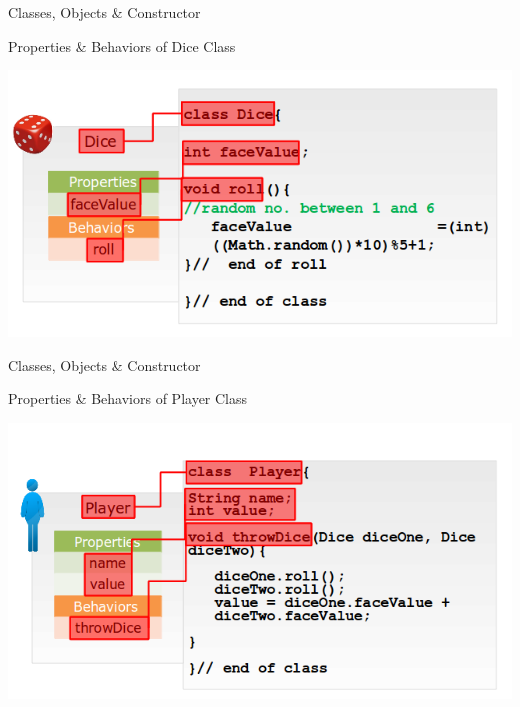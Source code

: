 \documentclass[14pt]{beamer}
\begin{document}
\begin{frame}{Classes, Objects \& Constructor}
\begin{center}
    Properties \& Behaviors of Dice Class
    \end{center}
\begin{center}
    \includegraphics[scale=0.5]{COJ-M01-S03-Image8.png}
\end{center}
\end{frame}
\begin{frame}{Classes, Objects \& Constructor}
\begin{center}
    Properties \& Behaviors of Player Class     
        \end{center}
        \begin{center}
                \includegraphics[scale=0.5]{COJ-M01-S03-Image9.png}
            \end{center}
        \end{frame}
      
\end{document}
